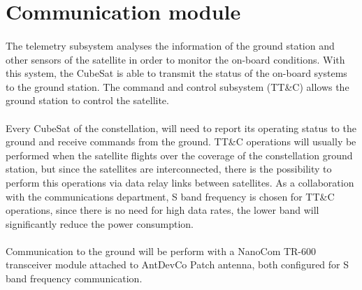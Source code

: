 \section{Communication module}

\paragraph{} The telemetry subsystem analyses the information of the ground station and other sensors of the satellite in order to monitor the on-board conditions. With this system, the CubeSat is able to transmit the status of the on-board systems to the ground station. The command and control subsystem (TT\&C) allows the ground station to control the satellite.

\paragraph{} Every CubeSat of the constellation, will need to report its operating status to the ground and receive commands from the ground. TT\&C operations will usually be performed when the satellite flights over the coverage of the constellation ground station, but since the satellites are interconnected, there is the possibility to perform this operations via data relay links between satellites. As a collaboration with the communications department, S band frequency is chosen for TT\&C operations, since there is no need for high data rates, the lower band will significantly reduce the power consumption.

\paragraph{} Communication to the ground will be perform with a NanoCom TR-600 transceiver module attached to AntDevCo Patch antenna, both configured for S band frequency communication.


